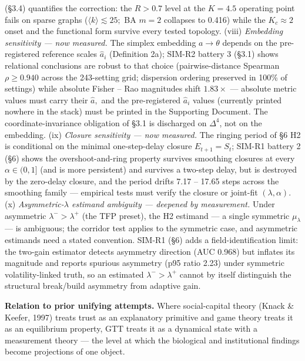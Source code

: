 \documentclass[11pt,twocolumn]{article}
\theoremstyle{gttdef}
\theoremstyle{gttplain}
\begin{document}
(\S{}3.4) quantifies the correction: the $R > 0.7$ level at the $K = 4.5$ operating point fails on sparse graphs ($\langle k\rangle \lesssim 25;$ BA $m = 2$ collapses to 0.416) while the $K_c \approx 2$ onset and the functional form survive every tested topology. (viii) \emph{Embedding sensitivity --- now measured.} The simplex embedding $a \to \theta$ depends on the pre-registered reference scales $\hat{a}_i$ (Definition 2a); SIM-R2 battery 3 (\S{}3.1) shows relational conclusions are robust to that choice (pairwise-distance Spearman $\rho \geq 0.940$ across the 243-setting grid; dispersion ordering preserved in 100\% of settings) while absolute Fisher -- Rao magnitudes shift $1.83\times$ --- absolute metric values must carry their $\hat{a},$ and the pre-registered $\hat{a}_i$ values (currently printed nowhere in the stack) must be printed in the Supporting Document. The coordinate-invariance obligation of \S{}3.1 is discharged on $\Delta^{4}$, not on the embedding. (ix) \emph{Closure sensitivity --- now measured.} The ringing period of \S{}6 H2 is conditional on the minimal one-step-delay closure $E_{t+1} = S_t$; SIM-R1 battery 2 (\S{}6) shows the overshoot-and-ring property survives smoothing closures at every $\alpha \in (0,1]$ (and is more persistent) and survives a two-step delay, but is destroyed by the zero-delay closure, and the period drifts 7.17 -- 17.65 steps across the smoothing family --- empirical tests must verify the closure or joint-fit $(\lambda, \alpha).$ (x) \emph{Asymmetric-$\lambda$ estimand ambiguity --- deepened by measurement.} Under asymmetric $\lambda^{-} > \lambda^{+}$ (the TFP preset), the H2 estimand --- a single symmetric $\mu_{\lambda}$ --- is ambiguous; the corridor test applies to the symmetric case, and asymmetric estimands need a stated convention. SIM-R1 (\S{}6) adds a field-identification limit: the two-gain estimator detects asymmetry direction (AUC 0.968) but inflates its magnitude and reports spurious asymmetry (p95 ratio 2.23) under symmetric volatility-linked truth, so an estimated $\lambda^{-} > \lambda^{+}$ cannot by itself distinguish the structural break/build asymmetry from adaptive gain.

\textbf{Relation to prior unifying attempts.} Where social-capital theory (Knack \& Keefer, 1997) treats trust as an explanatory primitive and game theory treats it as an equilibrium property, GTT treats it as a dynamical state with a measurement theory --- the level at which the biological and institutional findings become projections of one object.
\end{document}

